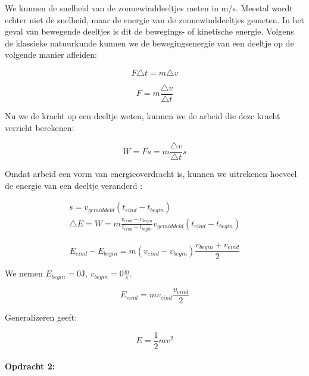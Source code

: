 We kunnen de snelheid van de zonnewinddeeltjes meten in m/s. Meestal
wordt echter niet de snelheid, maar de energie van de zonnewinddeeltjes
gemeten. In het geval van bewegende deeltjes is dit de bewegings-
of kinetische energie. Volgens de klassieke natuurkunde kunnen we
de bewegingsenergie van een deeltje op de volgende manier afleiden:

\begin{equation}
F\triangle t=m\triangle v
\end{equation}


\begin{equation}
F=m\frac{\triangle v}{\triangle t}
\end{equation}


Nu we de kracht op een deeltje weten, kunnen we de arbeid die deze
kracht verricht berekenen:

\begin{equation}
W=Fs=m\frac{\triangle v}{\triangle t}s
\end{equation}


Omdat arbeid een vorm van energieoverdracht is, kunnen we uitrekenen
hoeveel de energie van een deeltje veranderd :

\begin{equation}
\begin{array}{c}
s=v_{gemiddeld}(t_{eind}-t_{begin})\\
\triangle E=W=m\frac{v_{eind}-v_{begin}}{t_{eind}-t_{begin}}v_{gemiddeld}(t_{eind}-t_{begin})
\end{array}
\end{equation}


\begin{equation}
E_{eind}-E_{begin}=m(v_{eind}-v_{begin})\frac{v_{begin}+v_{eind}}{2}
\end{equation}


We nemen $E_{begin}=0\mathrm{J}$, $v_{begin}=0\frac{\mathrm{m}}{s}$.

\begin{equation}
E_{eind}=mv_{eind}\frac{v_{eind}}{2}
\end{equation}


Generalizeren geeft:

\begin{equation}
E=\frac{1}{2}mv^{2}
\end{equation}


\paragraph*{Opdracht 2:}


